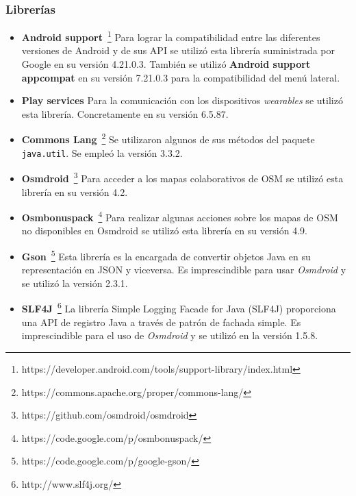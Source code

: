 \subsubsection{Librerías}

\begin{itemize}
  \item \textbf{Android
    support}~\footnote{https://developer.android.com/tools/support-library/index.html} Para lograr
    la compatibilidad entre las diferentes versiones de Android y de sus \acs{API} se utilizó esta
    librería suministrada por Google en su versión 4.21.0.3. También se utilizó \textbf{Android
      support appcompat} en su versión 7.21.0.3 para la compatibilidad del menú lateral.

  \item \textbf{Play services} Para la comunicación con los dispositivos \emph{wearables} se utilizó
    esta librería. Concretamente en su versión 6.5.87.

  \item \textbf{Commons Lang}~\footnote{https://commons.apache.org/proper/commons-lang/} Se
    utilizaron algunos de sus métodos del paquete \texttt{java.util}. Se empleó la versión 3.3.2.

  \item \textbf{Osmdroid}~\footnote{https://github.com/osmdroid/osmdroid} Para acceder a los mapas
    colaborativos de \acs{OSM} se utilizó esta librería en su versión 4.2.

  \item \textbf{Osmbonuspack}~\footnote{https://code.google.com/p/osmbonuspack/} Para realizar
    algunas acciones sobre los mapas de \acs{OSM} no disponibles en Osmdroid se utilizó esta
    librería en su versión 4.9.

  \item \textbf{Gson}~\footnote{https://code.google.com/p/google-gson/} Esta librería es la
    encargada de convertir objetos Java en su representación en JSON y viceversa. Es imprescindible
    para usar \emph{Osmdroid} y se utilizó la versión 2.3.1.

  \item \textbf{SLF4J}~\footnote{http://www.slf4j.org/} La librería Simple Logging Facade for Java
    (SLF4J) proporciona una \acs{API} de registro Java a través de patrón de fachada simple. Es
    imprescindible para el uso de \emph{Osmdroid} y se utilizó en la versión 1.5.8.

\end{itemize}

